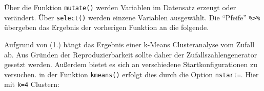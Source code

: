 \documentclass[12pt,]{book}
\newenvironment{Shaded}{\begin{snugshade}}{\end{snugshade}}
\newcommand{\KeywordTok}[1]{\textcolor[rgb]{0.13,0.29,0.53}{\textbf{{#1}}}}
\newcommand{\DataTypeTok}[1]{\textcolor[rgb]{0.13,0.29,0.53}{{#1}}}
\newcommand{\StringTok}[1]{\textcolor[rgb]{0.31,0.60,0.02}{{#1}}}
\newcommand{\NormalTok}[1]{{#1}}
\begin{document}
\begin{Shaded}
\end{Shaded}

Über die Funktion \texttt{mutate()} werden Variablen im Datensatz
erzeugt oder verändert. Über \texttt{select()} werden einzene Variablen
ausgewählt. Die ``Pfeife'' \texttt{\%\textgreater{}\%} übergeben das
Ergebnis der vorherigen Funktion an die folgende.

Aufgrund von (1.) hängt das Ergebnis einer k-Means Clusteranalyse vom
Zufall ab. Aus Gründen der Reproduzierbarkeit sollte daher der
Zufallszahlengenerator gesetzt werden. Außerdem bietet es sich an
verschiedene Startkonfigurationen zu versuchen. in der Funktion
\texttt{kmeans()} erfolgt dies durch die Option \texttt{nstart=}. Hier
mit \texttt{k=4} Clustern:
\end{document}
